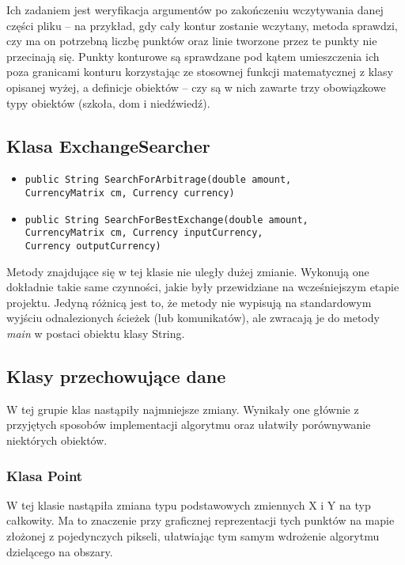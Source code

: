 \documentclass[a4paper,12pt]{article}
\newcommand\tab[1][0.6cm]{\hspace*{#1}}
\begin{document}
Ich zadaniem jest weryfikacja argumentów po zakończeniu wczytywania danej części pliku -- na przykład, gdy cały kontur zostanie wczytany, metoda sprawdzi, czy ma on potrzebną liczbę punktów oraz linie tworzone przez te punkty nie przecinają się. Punkty konturowe są sprawdzane pod kątem umieszczenia ich poza granicami konturu korzystając ze stosownej funkcji matematycznej z klasy opisanej wyżej, a definicje obiektów -- czy są w nich zawarte trzy obowiązkowe typy obiektów (szkoła, dom i niedźwiedź).

\subsection{Klasa ExchangeSearcher}

\begin{itemize}
\item \begin{lstlisting}
public String SearchForArbitrage(double amount,
CurrencyMatrix cm, Currency currency)
\end{lstlisting}

\item \begin{lstlisting}
public String SearchForBestExchange(double amount,
CurrencyMatrix cm, Currency inputCurrency,
Currency outputCurrency)
\end{lstlisting}
\end{itemize}

\tab Metody znajdujące się w tej klasie nie uległy dużej zmianie. Wykonują one dokładnie takie same czynności, jakie były przewidziane na wcześniejszym etapie projektu. Jedyną różnicą jest to, że metody nie wypisują na standardowym wyjściu odnalezionych ścieżek (lub komunikatów), ale zwracają je do metody \textit{main} w postaci obiektu klasy String.

\subsection{Klasy przechowujące dane} 

\tab W tej grupie klas nastąpiły najmniejsze zmiany. Wynikały one głównie z przyjętych sposobów implementacji algorytmu oraz ułatwiły porównywanie niektórych obiektów.

\subsubsection{Klasa Point}

\tab W tej klasie nastąpiła zmiana typu podstawowych zmiennych X i Y na typ całkowity. Ma to znaczenie przy graficznej reprezentacji tych punktów na mapie złożonej z pojedynczych pikseli, ułatwiając tym samym wdrożenie algorytmu dzielącego na obszary.
\end{document}
